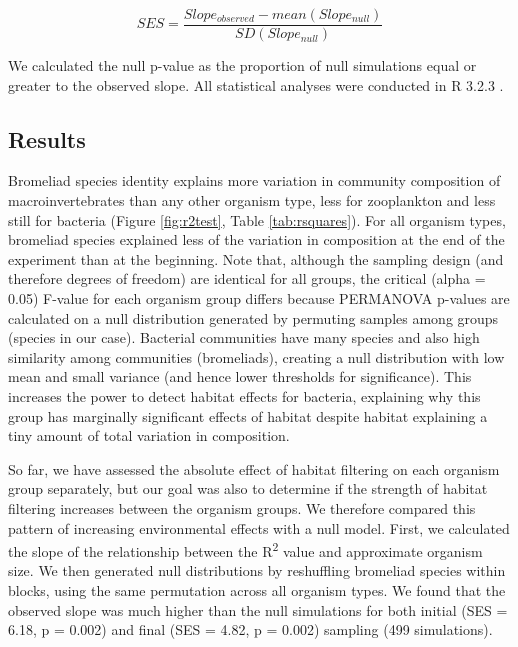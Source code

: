 \[SES = \frac{Slope_{observed} - mean(Slope_{null})}{SD(Slope_{null})}\]

We calculated the null p-value as the proportion of null simulations
equal or greater to the observed slope. All statistical analyses were
conducted in R 3.2.3 \citep{rcore}.

\subsection{Results}\label{results}

Bromeliad species identity explains more variation in community
composition of macroinvertebrates than any other organism type, less for
zooplankton and less still for bacteria (Figure \ref{fig:r2test}, Table \ref{tab:rsquares}). For all
organism types, bromeliad species explained less of the variation in
composition at the end of the experiment than at the beginning. Note
that, although the sampling design (and therefore degrees of freedom)
are identical for all groups, the critical (alpha = 0.05) F-value for
each organism group differs because PERMANOVA p-values are calculated on
a null distribution generated by permuting samples among groups (species
in our case). Bacterial communities have many species and also high
similarity among communities (bromeliads), creating a null distribution
with low mean and small variance (and hence lower thresholds for
significance). This increases the power to detect habitat effects for
bacteria, explaining why this group has marginally significant effects
of habitat despite habitat explaining a tiny amount of total variation
in composition.

So far, we have assessed the absolute effect of habitat filtering on
each organism group separately, but our goal was also to determine if
the strength of habitat filtering increases between the organism groups.
We therefore compared this pattern of increasing environmental effects
with a null model. First, we calculated the slope of the relationship
between the R\textsuperscript{2} value and approximate organism size. We
then generated null distributions by reshuffling bromeliad species
within blocks, using the same permutation across all organism types. We
found that the observed slope was much higher than the null simulations
for both initial (SES = 6.18, p = 0.002) and final (SES = 4.82, p =
0.002) sampling (499 simulations).


